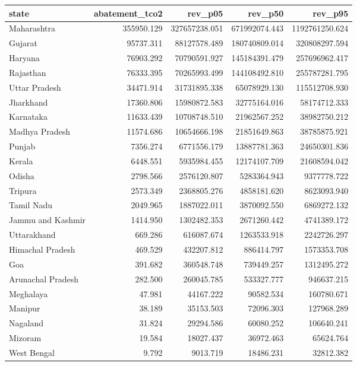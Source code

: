 \begin{tabular}{lrrrr}
\toprule
state & abatement_tco2 & rev_p05 & rev_p50 & rev_p95 \\
\midrule
Maharashtra & 355950.129 & 327657238.051 & 671992074.443 & 1192761250.624 \\
Gujarat & 95737.311 & 88127578.489 & 180740809.014 & 320808297.594 \\
Haryana & 76903.292 & 70790591.927 & 145184391.479 & 257696962.417 \\
Rajasthan & 76333.395 & 70265993.499 & 144108492.810 & 255787281.795 \\
Uttar Pradesh & 34471.914 & 31731895.338 & 65078929.130 & 115512708.930 \\
Jharkhand & 17360.806 & 15980872.583 & 32775164.016 & 58174712.333 \\
Karnataka & 11633.439 & 10708748.510 & 21962567.252 & 38982750.212 \\
Madhya Pradesh & 11574.686 & 10654666.198 & 21851649.863 & 38785875.921 \\
Punjab & 7356.274 & 6771556.179 & 13887781.363 & 24650301.836 \\
Kerala & 6448.551 & 5935984.455 & 12174107.709 & 21608594.042 \\
Odisha & 2798.566 & 2576120.807 & 5283364.943 & 9377778.722 \\
Tripura & 2573.349 & 2368805.276 & 4858181.620 & 8623093.940 \\
Tamil Nadu & 2049.965 & 1887022.011 & 3870092.550 & 6869272.132 \\
Jammu and Kashmir & 1414.950 & 1302482.353 & 2671260.442 & 4741389.172 \\
Uttarakhand & 669.286 & 616087.674 & 1263533.918 & 2242726.297 \\
Himachal Pradesh & 469.529 & 432207.812 & 886414.797 & 1573353.708 \\
Goa & 391.682 & 360548.748 & 739449.257 & 1312495.272 \\
Arunachal Pradesh & 282.500 & 260045.785 & 533327.777 & 946637.215 \\
Meghalaya & 47.981 & 44167.222 & 90582.534 & 160780.671 \\
Manipur & 38.189 & 35153.503 & 72096.303 & 127968.289 \\
Nagaland & 31.824 & 29294.586 & 60080.252 & 106640.241 \\
Mizoram & 19.584 & 18027.437 & 36972.463 & 65624.764 \\
West Bengal & 9.792 & 9013.719 & 18486.231 & 32812.382 \\

\end{tabular}
